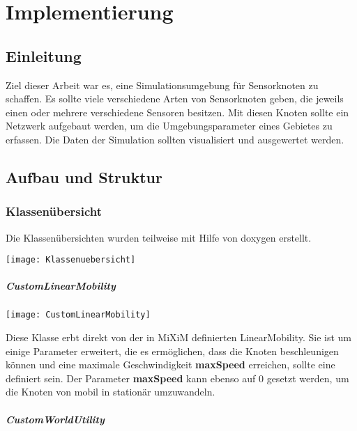 \chapter{Implementierung}

\section{Einleitung}

Ziel dieser Arbeit war es, eine Simulationsumgebung für Sensorknoten zu schaffen. Es sollte viele verschiedene Arten von Sensorknoten geben, die jeweils einen oder mehrere verschiedene Sensoren besitzen. Mit diesen Knoten sollte ein Netzwerk aufgebaut werden, um die Umgebungsparameter eines Gebietes zu erfassen.
Die Daten der Simulation sollten visualisiert und ausgewertet werden.

\section{Aufbau und Struktur}

\subsection{Klassenübersicht}

Die Klassenübersichten wurden teilweise mit Hilfe von doxygen\cite{doxygen} erstellt. 

\begin{center}
\texttt{[image: Klassenuebersicht]}
\end{center}

\paragraph{CustomLinearMobility}

\begin{center}
\texttt{[image: CustomLinearMobility]}
\end{center}

Diese Klasse erbt direkt von der in MiXiM definierten LinearMobility. Sie ist um einige Parameter erweitert, die es ermöglichen, dass die Knoten beschleunigen können und eine maximale Geschwindigkeit \textbf{maxSpeed} erreichen, sollte eine definiert sein.
Der Parameter \textbf{maxSpeed} kann ebenso auf 0 gesetzt werden, um die Knoten von mobil in stationär umzuwandeln.

\paragraph{CustomWorldUtility}

